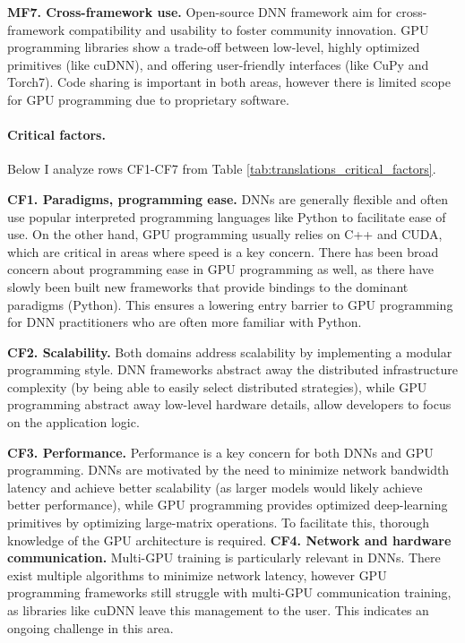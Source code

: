 \textbf{MF7. Cross-framework use.}
Open-source DNN framework aim for cross-framework compatibility and usability to foster community innovation.
GPU programming libraries show a trade-off between low-level, highly optimized primitives (like cuDNN), and offering
user-friendly interfaces (like CuPy and Torch7). Code sharing is important in both areas, however there is limited
scope for GPU programming due to proprietary software.

\paragraph{Critical factors.}
Below I analyze rows CF1-CF7 from Table \ref{tab:translations_critical_factors}.

\textbf{CF1. Paradigms, programming ease.}
DNNs are generally flexible and often use popular interpreted programming languages like Python to facilitate
ease of use.
On the other hand, GPU programming usually relies on C++ and CUDA, which are critical in areas
where speed is a key concern. There has been broad concern about programming ease in GPU programming
as well, as there have slowly been built new frameworks that provide bindings to the dominant paradigms
(Python). This ensures a lowering entry barrier to GPU programming for DNN practitioners who are
often more familiar with Python.

\textbf{CF2. Scalability.}
Both domains address scalability by implementing a modular programming style. DNN frameworks abstract away
the distributed infrastructure complexity (by being able to easily select distributed strategies), while
GPU programming abstract away low-level hardware details, allow developers to focus on the application logic.

\textbf{CF3. Performance.}
Performance is a key concern for both DNNs and GPU programming. DNNs are
motivated by the need to minimize network bandwidth latency and achieve better scalability (as larger
models would likely achieve better performance), while GPU programming provides optimized deep-learning
primitives by optimizing large-matrix operations. To facilitate this, thorough knowledge of the GPU
architecture is required.
\textbf{CF4. Network and hardware communication.}
Multi-GPU training is particularly relevant in DNNs. There exist multiple algorithms to minimize
network latency, however GPU programming frameworks still struggle with multi-GPU communication
training, as libraries like cuDNN leave this management to the user. This indicates an ongoing challenge
in this area.

